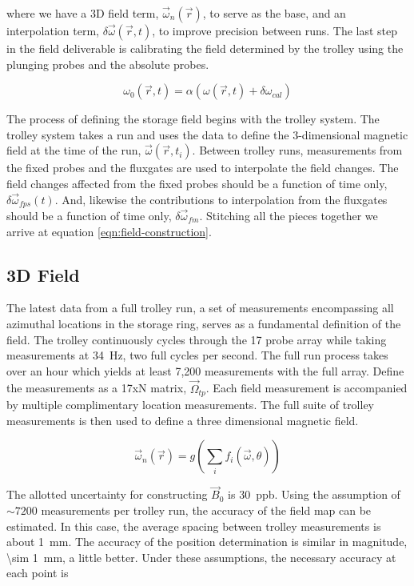 where we have a 3D field term, $\vec{\omega}_{n}(\vec{r})$, to serve as the base, and an interpolation term, $\delta \vec{\omega}(\vec{r}, t)$, to improve precision between runs. The last step in the field deliverable is calibrating the field determined by the trolley using the plunging probes and the absolute probes.

\begin{equation}
\label{eqn:field-calibration}
\omega_0(\vec{r}, t) = \alpha (\omega(\vec{r}, t) + \delta \omega_{cal})
\end{equation}

The process of defining the \gmtwo storage field begins with the trolley system.  The trolley system takes a run and uses the data to define the 3-dimensional magnetic field at the time of the run, $\vec{\omega}(\vec{r}, t_i)$.  Between trolley runs, measurements from the fixed probes and the fluxgates are used to interpolate the field changes.  The field changes affected from the fixed probes should be a function of time only, $\delta \vec{\omega}_{fps}(t)$.  And, likewise the contributions to interpolation from the fluxgates should be a function of time only, $\delta \vec{\omega}_{fm}$.  Stitching all the pieces together we arrive at equation \ref{eqn:field-construction}.

\subsection{3D Field}

The latest data from a full trolley run, a set of measurements encompassing all azimuthal locations in the storage ring, serves as a fundamental definition of the field.  The trolley continuously cycles through the 17 probe array while taking measurements at \SI{34}{\Hz}, two full cycles per second.  The full run process takes over an hour which yields at least 7,200 measurements with the full array.  Define the measurements as a 17xN matrix, $\vec{\Omega}_{tp}$. Each field measurement is accompanied by multiple complimentary location measurements.  The full suite of trolley measurements is then used to define a three dimensional magnetic field.

\begin{equation}
\label{eqn:field-base}
\vec{\omega}_{n}(\vec{r}) = g(\sum_{i}f_i(\vec{\omega}, \theta))
\end{equation}

The allotted uncertainty for constructing $\vec{B}_0$ is \SI{30}{ppb}.  Using the assumption of $\sim 7200$ measurements per trolley run, the accuracy of the field map can be estimated.  In this case, the average spacing between trolley measurements is about \SI{1}{mm}.  The accuracy of the position determination is similar in magnitude, \SI{\sim 1}{mm}, a little better.  Under these assumptions, the necessary accuracy at each point is 

